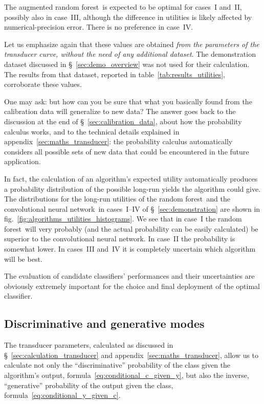 \documentclass[\ifafour a4paper,12pt,\else a5paper,10pt,\fi%
onecolumn,oneside,article,%
british%
]{memoir}
\theoremstyle{remark}
\theoremstyle{innote}
\renewcommand*{\|}[1][]{\nonscript\:#1\vert\nonscript\:\mathopen{}}
\newcommand*{\sect}{\S}%
\newcommand*{\fig}{fig.}%
\newcommand*{\RF}{random forest}
\newcommand*{\CNN}{convolutional neural network}
\begin{document}
%
The augmented \RF\ is expected to be optimal for cases~I and~II, possibly also in case~III, although the difference in utilities is likely affected by numerical-precision error. There is no preference in case~IV.

Let us emphasize again that these values are obtained \emph{from the parameters of the transducer curve, without the need of any additional dataset}. The demonstration dataset discussed in \sect~\ref{sec:demo_overview} was not used for their calculation. The results from that dataset, reported in table~\ref{tab:results_utilities}, corroborate these values.


One may ask: but how can you be sure that what you basically found from the calibration data will generalize to new data? The answer goes back to the discussion at the end of \sect~\ref{sec:calibration_data}, about how the probability calculus works, and to the technical details explained in appendix~\ref{sec:maths_transducer}: the probability calculus automatically considers all possible sets of new data that could be encountered in the future application.

In fact, the calculation of an algorithm's expected utility automatically produces a probability distribution of the possible long-run yields the algorithm could give. The distributions for the long-run utilities of the \RF\ and the \CNN\ in cases~I--IV of \sect~\ref{sec:demonstration} are shown in \fig~\ref{fig:algorithms_utilities_histograms}.
We see that in case~I the \RF\ will very probably (and the actual probability can be easily calculated) be superior to the \CNN. In case~II the probability is somewhat lower. In cases~III and~IV it is completely uncertain which algorithm will be best.

The evaluation of candidate classifiers' performances and their uncertainties are obviously extremely important for the choice and final deployment of the optimal classifier.

\subsection{Discriminative and generative modes}
\label{sec:effect_transd}

The transducer parameters, calculated as discussed in \sect~\ref{sec:calculation_transducer} and appendix~\ref{sec:maths_transducer}, allow us to calculate not only the \enquote{discriminative} probability of the class given the algorithm's output, formula~\eqref{eq:conditional_c_given_y}, but also the inverse, \enquote{generative} probability of the output given the class, formula~\eqref{eq:conditional_y_given_c}.
\end{document}

